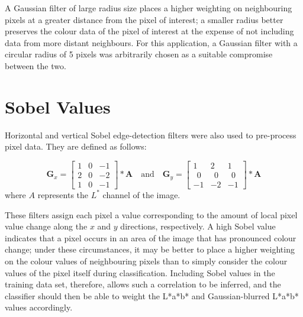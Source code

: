 A Gaussian filter of large radius size places a higher weighting on neighbouring pixels at a greater distance from the pixel of interest; a smaller radius better preserves the colour data of the pixel of interest at the expense of not including data from more distant neighbours.  For this application, a Gaussian filter with a circular radius of 5 pixels was arbitrarily chosen as a suitable compromise between the two. 

\section{Sobel Values}
Horizontal and vertical Sobel edge-detection filters were also used to pre-process pixel data. They are defined as follows:

$$ \mathbf{G}_x = 
\begin{bmatrix} 1 & 0 & -1 \\
2 & 0 & -2 \\
1 & 0 & -1 
\end{bmatrix} * \mathbf{A}
\quad
\mbox{and}
\quad   
\mathbf{G}_y = \begin{bmatrix} 
1 & 2 & 1  \\
\ \ 0 & \ \ 0 & \ \ 0 \\
-1 & -2 & -1 
\end{bmatrix} * \mathbf{A}
$$
where $A$ represents the $L^*$ channel of the image.

These filters assign each pixel a value corresponding to the amount of local pixel value change along the $x$ and $y$ directions, respectively.  A high Sobel value indicates that a pixel occurs in an area of the image that has pronounced colour change; under these circumstances, it may be better to place a higher weighting on the colour values of neighbouring pixels than to simply consider the colour values of the pixel itself during classification.  Including Sobel values in the training data set, therefore, allows such a correlation to be inferred, and the classifier should then be able to weight the L*a*b* and Gaussian-blurred L*a*b* values accordingly.